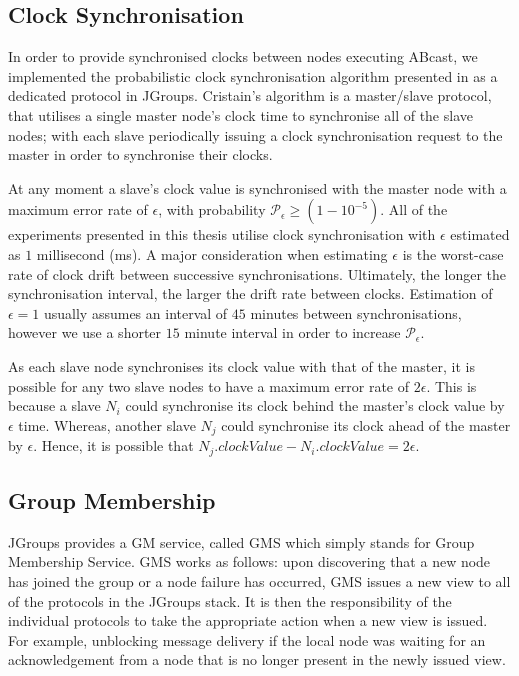 	\subsection{Clock Synchronisation}\label{ssec:clocksynch}
	In order to provide synchronised clocks between nodes executing \textsf{ABcast}, we implemented the probabilistic clock synchronisation algorithm presented in \citep{Cristian:1996:SA:227210.227231} as a dedicated protocol in JGroups.  Cristain's algorithm is a master/slave protocol, that utilises a single master node's clock time to synchronise all of the slave nodes; with each slave periodically issuing a clock synchronisation request to the master in order to synchronise their clocks.  
			
			At any moment a slave's clock value is synchronised with the master node with a maximum error rate of $\epsilon$, with probability $\mathcal{P}_\epsilon \geq (1- 10^{-5})$. All of the experiments presented in this thesis utilise clock synchronisation with $\epsilon$ estimated as $1$ millisecond (ms).  A major consideration when estimating $\epsilon$ is the worst-case rate of clock drift between successive synchronisations. Ultimately, the longer the synchronisation interval, the larger the drift rate between clocks.  Estimation of $\epsilon = 1$ usually assumes an interval of $45$ minutes between synchronisations, however we use a shorter $15$ minute interval in order to increase $\mathcal{P}_\epsilon$.
			
			As each slave node synchronises its clock value with that of the master, it is possible for any two slave nodes to have a maximum error rate of $2\epsilon$.  This is because a slave $N_i$ could synchronise its clock behind the master's clock value by $\epsilon$ time.  Whereas, another slave $N_j$ could synchronise its clock ahead of the master by $\epsilon$. Hence, it is possible that $N_j.clockValue - N_i.clockValue = 2\epsilon$.  

    \subsection{Group Membership}\label{ssec:jgroups_gm}
	JGroups provides a GM service, called GMS which simply stands for Group Membership Service. GMS works as follows: upon discovering that a new node has joined the group or a node failure has occurred, GMS issues a new view to all of the protocols in the JGroups stack.  It is then the responsibility of the individual protocols to take the appropriate action when a new view is issued.  For example, unblocking message delivery if the local node was waiting for an acknowledgement from a node that is no longer present in the newly issued view.  	
	
